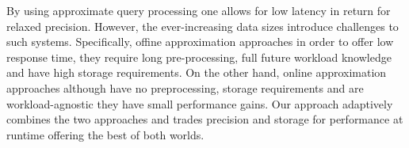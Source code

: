 By using approximate query processing one allows for low latency in return for 
relaxed precision. However, the ever-increasing data sizes introduce 
challenges to such systems. Specifically, offine approximation 
approaches in order to offer low response time, they require long 
pre-processing, full future workload knowledge and have high storage 
requirements. On the other hand, online approximation approaches 
although have no preprocessing, storage requirements and are
workload-agnostic they have small performance gains. Our approach 
adaptively combines the two approaches and trades precision and 
storage for performance at runtime offering the best of both worlds.